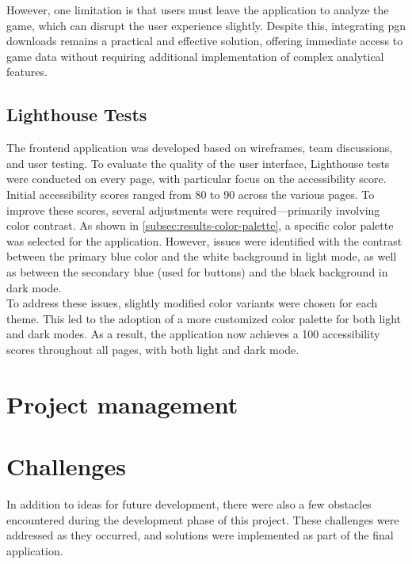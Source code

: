 However, one limitation is that users must leave the application to analyze the game, which can disrupt the user experience slightly. Despite this, integrating \gls{pgn} downloads remains a practical and effective solution, offering immediate access to game data without requiring additional implementation of complex analytical features.

\subsection{Lighthouse Tests}
The frontend application was developed based on wireframes, team discussions, and user testing. To evaluate the quality of the user interface, Lighthouse tests were conducted on every page, with particular focus on the accessibility score. \\

Initial accessibility scores ranged from 80 to 90 across the various pages. To improve these scores, several adjustments were required—primarily involving color contrast. As shown in \ref{subsec:results-color-palette}, a specific color palette was selected for the application. However, issues were identified with the contrast between the primary blue color and the white background in light mode, as well as between the secondary blue (used for buttons) and the black background in dark mode. \\

To address these issues, slightly modified color variants were chosen for each theme. This led to the adoption of a more customized color palette for both light and dark modes. As a result, the application now achieves a 100 accessibility scores throughout all pages, with both light and dark mode. 

\section{Project management}
\label{sec:discussion-project-management}

\section{Challenges}
In addition to ideas for future development, there were also a few obstacles encountered during the development phase of this project. These challenges were addressed as they occurred, and solutions were implemented as part of the final application. \\

